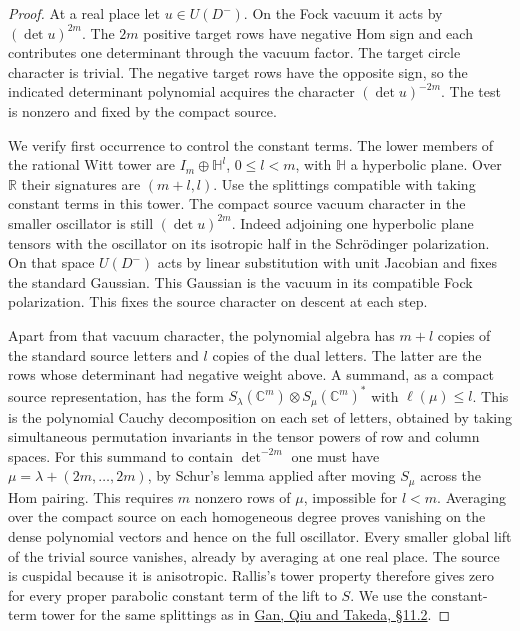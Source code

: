 \documentclass[a4paper,11pt]{article}
\theoremstyle{definition}
\theoremstyle{remark}
\newcommand{\RR}{\mathbb R}\newcommand{\CC}{\mathbb C}\newcommand{\QQ}{\mathbb Q}
\numberwithin{equation}{section}
\begin{document}
\begin{proof}
At a real place let \(u\in U(D^-)\). On the Fock vacuum it
acts by \((\det u)^{2m}\). The \(2m\) positive target rows
have negative Hom sign and each contributes one determinant
through the vacuum factor. The target circle character is
trivial. The negative target rows have the opposite sign,
so the indicated determinant polynomial acquires the
character \((\det u)^{-2m}\). The test is nonzero and fixed
by the compact source.

We verify first occurrence to control the constant terms.
The lower members of the rational Witt tower are
\(I_m\oplus\mathbb H^l\), \(0\le l<m\), with \(\mathbb H\)
a hyperbolic plane. Over \(\RR\) their signatures are
\((m+l,l)\). Use the splittings compatible with taking
constant terms in this tower. The compact source vacuum
character in the smaller oscillator is still
\((\det u)^{2m}\). Indeed adjoining one hyperbolic plane
tensors with the oscillator on its isotropic half in the
Schr\"odinger polarization. On that space \(U(D^-)\) acts
by linear substitution with unit Jacobian and fixes the
standard Gaussian. This Gaussian is the vacuum in its
compatible Fock polarization. This fixes the source
character on descent at each step.

Apart from that vacuum character, the polynomial algebra
has \(m+l\) copies of the standard source letters and \(l\)
copies of the dual letters. The latter are the rows whose
determinant had negative weight above. A summand, as a
compact source representation, has the form
\(S_\lambda(\CC^m)\otimes S_\mu(\CC^m)^*\) with
\(\ell(\mu)\le l\). This is the polynomial Cauchy
decomposition on each set of letters, obtained by taking
simultaneous permutation invariants in the tensor powers
of row and column spaces. For this summand to contain
\(\det^{-2m}\) one must have
\(\mu=\lambda+(2m,\ldots,2m)\), by Schur's lemma applied
after moving \(S_\mu\) across the Hom pairing.
This requires \(m\) nonzero rows of \(\mu\), impossible
for \(l<m\). Averaging over the compact source on each
homogeneous degree proves vanishing on the dense polynomial
vectors and hence on the full oscillator. Every smaller
global lift of the trivial source vanishes, already by
averaging at one real place. The source is cuspidal because
it is anisotropic. Rallis's tower property therefore gives
zero for every proper parabolic constant term of the lift
to \(S\). We use the constant-term tower for the same
splittings as in \href{https://arxiv.org/pdf/1207.4709}
{Gan, Qiu and Takeda, \S11.2}.


\end{proof}
\end{document}
